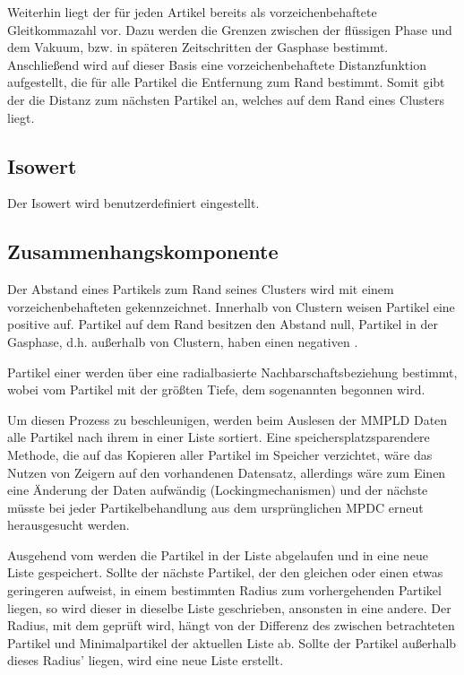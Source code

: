 Weiterhin liegt der  für jeden Artikel bereits als vorzeichenbehaftete Gleitkommazahl vor. Dazu werden die Grenzen zwischen der flüssigen Phase und dem Vakuum, bzw. in späteren Zeitschritten der Gasphase bestimmt. Anschließend wird auf dieser Basis eine vorzeichenbehaftete Distanzfunktion aufgestellt, die für alle Partikel die Entfernung zum Rand bestimmt. Somit gibt der  die Distanz zum nächsten Partikel an, welches auf dem Rand eines Clusters liegt.

\subsection{Isowert}

Der Isowert wird benutzerdefiniert eingestellt.

\subsection{Zusammenhangskomponente}

Der Abstand eines Partikels zum Rand seines Clusters wird mit einem vorzeichenbehafteten  gekennzeichnet. Innerhalb von Clustern weisen Partikel eine positive  auf. Partikel auf dem Rand besitzen den Abstand null, Partikel in der Gasphase, d.h. außerhalb von Clustern, haben einen negativen .

Partikel einer  werden über eine radialbasierte Nachbarschaftsbeziehung bestimmt, wobei vom Partikel mit der größten Tiefe, dem sogenannten  begonnen wird.

Um diesen Prozess zu beschleunigen, werden beim Auslesen der MMPLD Daten alle Partikel nach ihrem  in einer Liste sortiert. Eine speichersplatzsparendere Methode, die auf das Kopieren aller Partikel im Speicher verzichtet, wäre das Nutzen von Zeigern auf den vorhandenen Datensatz, allerdings wäre zum Einen eine Änderung der Daten aufwändig (Lockingmechanismen) und der nächste  müsste bei jeder Partikelbehandlung aus dem ursprünglichen MPDC erneut herausgesucht werden.

Ausgehend vom  werden die Partikel in der Liste abgelaufen und in eine neue Liste gespeichert. Sollte der nächste Partikel, der den gleichen oder einen etwas geringeren  aufweist, in einem bestimmten Radius zum vorhergehenden Partikel liegen, so wird dieser in dieselbe Liste geschrieben, ansonsten in eine andere. Der Radius, mit dem geprüft wird, hängt von der Differenz des  zwischen betrachteten Partikel und Minimalpartikel der aktuellen Liste ab. Sollte der Partikel außerhalb dieses Radius' liegen, wird eine neue Liste erstellt.

